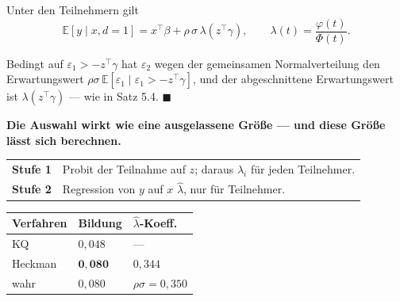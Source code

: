 \begin{merksatz}
Unter den Teilnehmern gilt
\[ \mathbb{E}[y\mid x, d=1] = x^{\top}\beta + \rho\,\sigma\,\lambda(z^{\top}\gamma), \qquad \lambda(t) = \frac{\varphi(t)}{\Phi(t)} . \]

Bedingt auf $\varepsilon_1 > -z^{\top}\gamma$ hat $\varepsilon_2$ wegen der gemeinsamen Normalverteilung den Erwartungswert $\rho\sigma\,\mathbb{E}[\varepsilon_1\mid\varepsilon_1>-z^{\top}\gamma]$, und der abgeschnittene Erwartungswert ist $\lambda(z^{\top}\gamma)$ --- wie in Satz 5.4. $\blacksquare$

\begin{center}
\begin{minipage}{0.9\textwidth}
\textbf{Die Auswahl wirkt wie eine ausgelassene Größe --- und diese Größe lässt sich berechnen.}
\end{minipage}
\end{center}

\begin{center}
{\small
\renewcommand{\arraystretch}{1.5}
\begin{tabular}{@{}P{2.2cm}P{6.4cm}@{}}
\toprule
\textbf{Stufe 1} & Probit der Teilnahme auf $z$; daraus $\hat\lambda_i$ für jeden Teilnehmer.\\
\textbf{Stufe 2} & Regression von $y$ auf $x$  $\hat\lambda$, nur für Teilnehmer.\\
\bottomrule
\end{tabular}}
\end{center}

\begin{center}
{\small
\renewcommand{\arraystretch}{1.48}
\begin{tabular}{@{}P{3.0cm}P{2.2cm}P{2.4cm}@{}}
\toprule
\textbf{Verfahren} & \textbf{Bildung} & $\hat\lambda$\textbf{-Koeff.}\\
\midrule
KQ & $0{,}048$ & ---\\
Heckman & $\mathbf{0{,}080}$ & $0{,}344$\\
\midrule
wahr & $0{,}080$ & $\rho\sigma = 0{,}350$\\
\bottomrule
\end{tabular}}
\end{center}

\begin{center}
\begin{minipage}{0.88\textwidth}
\end{minipage}
\end{center}
\end{merksatz}

